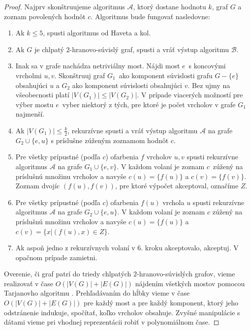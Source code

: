 \begin{proof}
    Najprv skonštruujeme algoritmus $\mathcal{A}$, ktorý dostane hodnotu $k$, graf $G$ a zoznam
    povolených hodnôt $c$. Algoritmus bude fungovať nasledovne:

    \begin{enumerate}
        \item Ak $k \leq 5$, spusti algoritmus od Haveta a kol.
        \item Ak $G$ je chlpatý $2$-hranovo-súvislý graf, spusti a vráť výstup algoritmu $\mathcal{B}$.
        \item Inak sa v grafe nachádza netriviálny most. Nájdi most $e$ s koncovými vrcholmi $u, v$.
        Skonštruuj graf $G_1$ ako komponent súvislosti grafu $G - \{e\}$ obsahujúci $u$ a $G_2$ ako
        komponent súvislosti obsahujúci $v$. Bez ujmy na všeobecnosti platí $|V(G_1)| \leq |V(G_2)|$.
        V prípade viacerých možností pre výber mostu $e$ vyber niektorý z tých, pre ktoré je počet
        vrcholov v grafe $G_1$ najmenší.
        \item Ak $\left |V(G_1) \right| \leq \frac{k}{2}$, rekurzívne spusti a vráť výstup algoritmu
        $\mathcal{A}$ na grafe $G_2 \cup \{e, u\}$ s príslušne zúženým zoznamom hodnôt $c$.
        \item Pre všetky prípustné (podľa $c$) ofarbenia $f$ vrcholov $u, v$ spusti rekurzívne
        algoritmus $\mathcal{A}$ na grafe $G_1 \cup \{e, v\}$. V každom volaní je zoznam $c$ zúžený
        na príslušnú množinu vrcholov a navyše $c(u) = \{f(u)\}$ a $c(v) = \{f(v)\}$. Zoznam dvojíc
        $(f(u), f(v))$, pre ktoré výpočet akceptoval, označíme $Z$.
        \item Pre všetky prípustné (podľa $c$) ofarbenia $f(u)$ vrchola $u$ spusti rekurzívne
        algoritmus $\mathcal{A}$ na grafe $G_2 \cup \{e, u\}$. V každom volaní je zoznam $c$ zúžený
        na príslušnú množinu vrcholov a navyše $c(u) = \{f(u)\}$ a $c(v) = \{x | (f(u), x) \in Z\}$.
        \item Ak aspoň jedno z rekurzívnych volaní v 6. kroku akceptovalo, akceptuj. V opačnom prípade
        zamietni.
    \end{enumerate}

    Overenie, či graf patrí do triedy chlpatých $2$-hranovo-súvislých grafov, vieme realizovať v čase
    $O(|V(G)| + |E(G)|)$ nájdením všetkých mostov pomocou Tarjanovho
    algoritmu \cite{tarjan_bridge}. Prehľadávaním do hĺbky vieme v čase $O(|V(G)| + |E(G)|)$ pre
    každý most a pre každý komponent, ktorý jeho odstránenie indukuje, spočítať, koľko vrcholov obsahuje.
    Zvyšné manipulácie s dátami vieme pri vhodnej reprezentácii robiť v polynomiálnom čase.


\end{proof}
